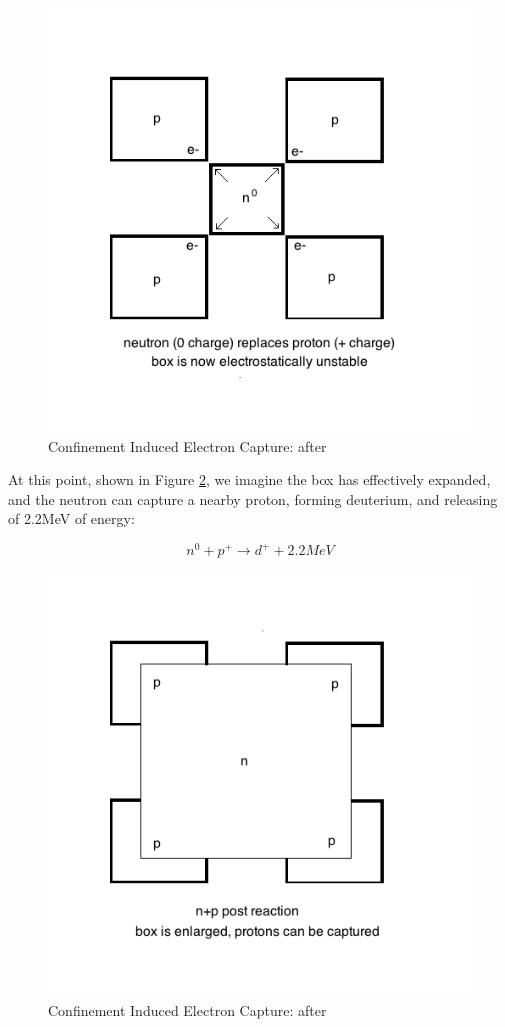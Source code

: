 \documentclass[%
 aip,
 jmp,%
 amsmath,amssymb,
 reprint,%
]{revtex4-1}
\begin{document}
\begin{figure}
   \includegraphics[scale=0.5]{img/box-after.png}
   \caption{Confinement Induced Electron Capture: after}
  \label{fig:box2}
\end{figure}

At this point, shown in Figure \ref{fig:box3}, we imagine the box has effectively expanded, and the neutron can capture a nearby proton, forming deuterium, and releasing of 2.2MeV of energy:  

$$n^{0}+p^{+}\rightarrow d^{+}+2.2MeV$$

\begin{figure}
   \includegraphics[scale=0.5]{img/box-enlarged.png}
   \caption{Confinement Induced Electron Capture: after}
  \label{fig:box3}
\end{figure}
\end{document}

